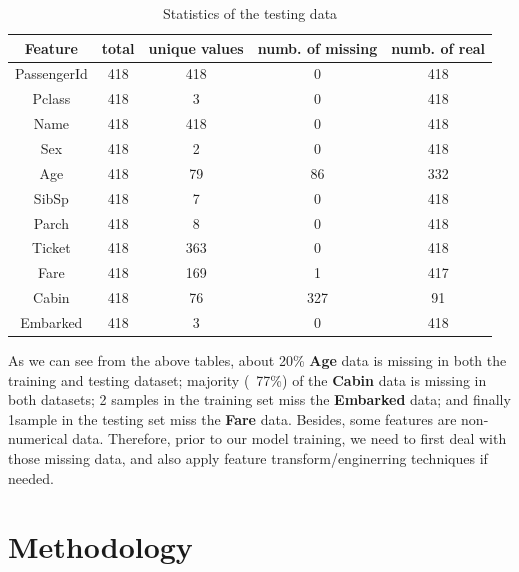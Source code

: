 \begin{table}[H]
    \centering
    \begin{tabular}{|c|c|c|c|c|}
        \hline 
        Feature    &total       &unique values  &numb. of missing  &numb. of real   \\
        \hline
        PassengerId &418         &418         &0           &418               \\         
        Pclass      &418         &3           &0           &418               \\         
        Name        &418         &418         &0           &418               \\         
        Sex         &418         &2           &0           &418               \\         
        Age         &418         &79          &86          &332               \\         
        SibSp       &418         &7           &0           &418               \\         
        Parch       &418         &8           &0           &418               \\         
        Ticket      &418         &363         &0           &418               \\         
        Fare        &418         &169         &1           &417               \\         
        Cabin       &418         &76          &327         &91                \\         
        Embarked    &418         &3           &0           &418               \\ 
        \hline
    \end{tabular}
    \caption{Statistics of the testing data}
    \label{the training data}
\end{table}

As we can see from the above tables, about 20\% \textbf{Age} data is missing in both the training and testing dataset; majority (~77\%) of the \textbf{Cabin} data is missing in both datasets; 2 samples in the training set miss the \textbf{Embarked} data; and finally 1sample in the testing set miss the \textbf{Fare} data. Besides, some features are non-numerical data. Therefore, prior to our model training, we need to first deal with those missing data, and also apply feature transform/enginerring techniques if needed.


\section*{\textbf{Methodology}}

